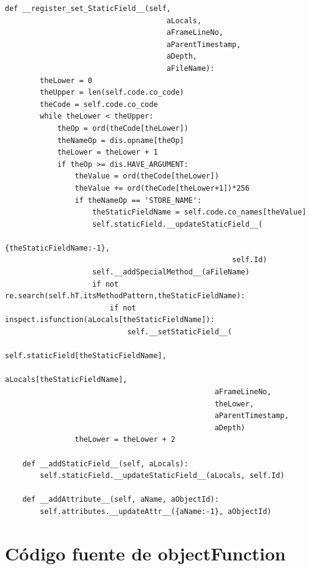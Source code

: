 \documentclass[12pt,legalpaper]{report}
\begin{document}
\begin{singlespace}
\begin{lstlisting}[style=Python]
    def __register_set_StaticField__(self, 
                                     aLocals, 
                                     aFrameLineNo,
                                     aParentTimestamp,
                                     aDepth,
                                     aFileName):
        theLower = 0
        theUpper = len(self.code.co_code)
        theCode = self.code.co_code   
        while theLower < theUpper:
            theOp = ord(theCode[theLower])
            theNameOp = dis.opname[theOp]      
            theLower = theLower + 1
            if theOp >= dis.HAVE_ARGUMENT:
                theValue = ord(theCode[theLower])
                theValue += ord(theCode[theLower+1])*256
                if theNameOp == 'STORE_NAME':
                    theStaticFieldName = self.code.co_names[theValue] 
                    self.staticField.__updateStaticField__(
                                                    {theStaticFieldName:-1}, 
                                                    self.Id)
                    self.__addSpecialMethod__(aFileName)
                    if not re.search(self.hT.itsMethodPattern,theStaticFieldName):
                        if not inspect.isfunction(aLocals[theStaticFieldName]):
                            self.__setStaticField__(
                                                self.staticField[theStaticFieldName], 
                                                aLocals[theStaticFieldName],
                                                aFrameLineNo,
                                                theLower,
                                                aParentTimestamp,
                                                aDepth)
                theLower = theLower + 2
    
    def __addStaticField__(self, aLocals):
        self.staticField.__updateStaticField__(aLocals, self.Id)
    
    def __addAttribute__(self, aName, aObjectId):
        self.attributes.__updateAttr__({aName:-1}, aObjectId)  
\end{lstlisting}
\end{singlespace}

	\section{Código fuente de objectFunction}
\end{document}
